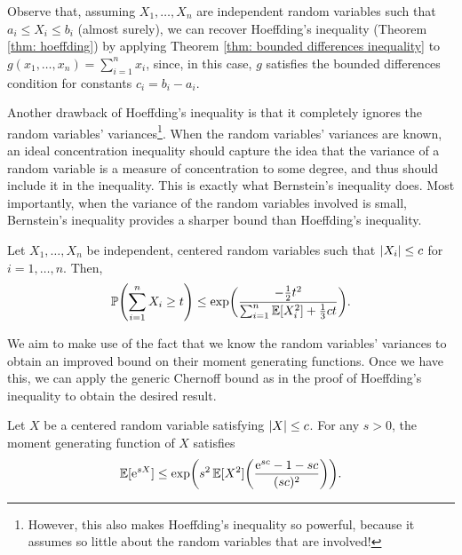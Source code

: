 Observe that, assuming $X_1, \dots, X_n$ are independent random variables such that $a_i \leq X_i \leq b_i$ (almost surely), we can recover Hoeffding's inequality (Theorem \ref{thm: hoeffding}) by applying Theorem \ref{thm: bounded differences inequality} to $g(x_1, \dots, x_n) = \sum_{i=1}^n x_i$, since, in this case, $g$ satisfies the bounded differences condition for constants $c_i = b_i - a_i$.

Another drawback of Hoeffding's inequality is that it completely ignores the random variables' variances\footnote{However, this also makes Hoeffding's inequality so powerful, because it assumes so little about the random variables that are involved!}. When the random variables' variances are known, an ideal concentration inequality should capture the idea that the variance of a random variable is a measure of concentration to some degree, and thus should include it in the inequality. This is exactly what Bernstein's inequality does. Most importantly, when the variance of the random variables involved is small, Bernstein's inequality provides a sharper bound than Hoeffding's inequality.

\begin{theorem}
\label{thm: bernstein}
Let $X_1, \dots, X_n$ be independent, centered random variables such that $\abs{X_i} \leq c$ for $i = 1, \dots, n$. Then,
\[
    \Prob\left(\sum_{i=1}^n X_i \geq t\right) \leq \exp(\frac{-\frac{1}{2}t^2}{\sum_{i=1}^n \Exp[X_i^2] + \frac{1}{3}ct}).
\]
\end{theorem}

We aim to make use of the fact that we know the random variables' variances to obtain an improved bound on their moment generating functions. Once we have this, we can apply the generic Chernoff bound as in the proof of Hoeffding's inequality to obtain the desired result.

\begin{lemma}
\label{lem: bernstein}
Let $X$ be a centered random variable satisfying $\abs{X} \leq c$. For any $s > 0$, the moment generating function of $X$ satisfies
\[
    \Exp[\e^{sX}] \leq \exp(s^2 \Exp[X^2] \left(\frac{\e^{sc} - 1 - sc}{(sc)^2} \right)).
\]
\end{lemma}

